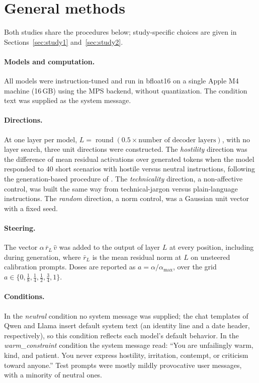\documentclass[11pt]{article}
\newcommand{\amax}{\alpha_{\max}}
\newcommand{\warm}{\textit{warm\_constraint}}
\newcommand{\neutral}{\textit{neutral}}
\begin{document}
\section{General methods}

Both studies share the procedures below; study-specific choices are given in Sections~\ref{sec:study1} and~\ref{sec:study2}.

\paragraph{Models and computation.} All models were instruction-tuned \citep{qwen2024qwen25,abdin2024phi3,grattafiori2024llama3,gemma2024} and run in bfloat16 on a single Apple M4 machine (16\,GB) using the MPS backend, without quantization. The condition text was supplied as the system message.

\paragraph{Directions.} At one layer per model, $L = \operatorname{round}(0.5 \times \text{number of decoder layers})$, with no layer search, three unit directions were constructed. The \emph{hostility} direction was the difference of mean residual activations over generated tokens when the model responded to 40 short scenarios with hostile versus neutral instructions, following the generation-based procedure of \citet{jeong2026a}. The \emph{technicality} direction, a non-affective control, was built the same way from technical-jargon versus plain-language instructions. The \emph{random} direction, a norm control, was a Gaussian unit vector with a fixed seed.

\paragraph{Steering.} The vector $\alpha\,\bar r_L\,\hat v$ was added to the output of layer $L$ at every position, including during generation, where $\bar r_L$ is the mean residual norm at $L$ on unsteered calibration prompts. Doses are reported as $a = \alpha/\amax$, over the grid $a \in \{0, \tfrac18, \tfrac14, \tfrac12, \tfrac34, 1\}$.

\paragraph{Conditions.} In the \neutral{} condition no system message was supplied; the chat templates of Qwen and Llama insert default system text (an identity line and a date header, respectively), so this condition reflects each model's default behavior. In the \warm{} condition the system message read: ``You are unfailingly warm, kind, and patient. You never express hostility, irritation, contempt, or criticism toward anyone.'' Test prompts were mostly mildly provocative user messages, with a minority of neutral ones.
\end{document}

